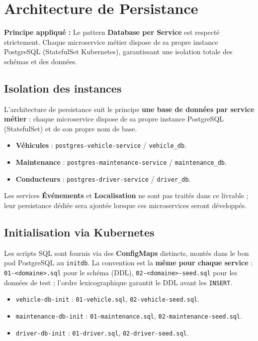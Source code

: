\documentclass[12pt,a4paper]{article}
\begin{document}
\section{Architecture de Persistance}

\begin{infobox}
\textbf{Principe appliqué :} Le pattern \textbf{Database per Service} est respecté strictement. Chaque microservice métier dispose de sa propre instance PostgreSQL (StatefulSet Kubernetes), garantissant une isolation totale des schémas et des données.
\end{infobox}

\subsection{Isolation des instances}

L'architecture de persistance suit le principe \textbf{une base de données par service métier} : chaque microservice dispose de sa propre instance PostgreSQL (StatefulSet) et de son propre nom de base.

\begin{itemize}
    \item \textbf{Véhicules} : \texttt{postgres-vehicle-service} / \texttt{vehicle\_db}.
    \item \textbf{Maintenance} : \texttt{postgres-maintenance-service} / \texttt{maintenance\_db}.
    \item \textbf{Conducteurs} : \texttt{postgres-driver-service} / \texttt{driver\_db}.
\end{itemize}

Les services \textbf{Événements} et \textbf{Localisation} ne sont pas traités dans ce livrable ; leur persistance dédiée sera ajoutée lorsque ces microservices seront développés.

\subsection{Initialisation via Kubernetes}

Les scripts SQL sont fournis via des \textbf{ConfigMaps} distincts, montés dans le bon pod PostgreSQL au \texttt{initdb}. La convention est la \textbf{même pour chaque service} : \texttt{01-<domaine>.sql} pour le schéma (DDL), \texttt{02-<domaine>-seed.sql} pour les données de test ; l'ordre lexicographique garantit le DDL avant les \texttt{INSERT}.

\begin{itemize}
    \item \texttt{vehicle-db-init} : \texttt{01-vehicle.sql}, \texttt{02-vehicle-seed.sql}.
    \item \texttt{maintenance-db-init} : \texttt{01-maintenance.sql}, \texttt{02-maintenance-seed.sql}.
    \item \texttt{driver-db-init} : \texttt{01-driver.sql}, \texttt{02-driver-seed.sql}.
\end{itemize}
\end{document}
